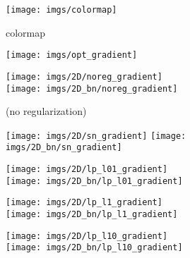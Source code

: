 \documentclass{article}
\begin{document}
\begin{figure}[h]

\begin{subfigure}{\linewidth}
\begin{subfigure}{.16\linewidth}
  \centering
  \texttt{[image: imgs/colormap]}
  \caption{colormap}
\end{subfigure}
\begin{subfigure}{.16\linewidth}
  \centering
  \texttt{[image: imgs/opt\_gradient]}
  \caption{}
\end{subfigure}
\begin{subfigure}{.33\linewidth}
  \texttt{[image: imgs/2D/noreg\_gradient]}\hfill
  \texttt{[image: imgs/2D\_bn/noreg\_gradient]}
  \caption{ (no regularization)}
\end{subfigure}
\begin{subfigure}{.33\linewidth}
  \texttt{[image: imgs/2D/sn\_gradient]}\hfill
  \texttt{[image: imgs/2D\_bn/sn\_gradient]}
  \caption{}
\end{subfigure}
\end{subfigure}\par

\begin{subfigure}{\linewidth}
\begin{subfigure}{.33\linewidth}
  \texttt{[image: imgs/2D/lp\_l01\_gradient]}\hfill
  \texttt{[image: imgs/2D\_bn/lp\_l01\_gradient]}
  \caption{}
\end{subfigure}
\begin{subfigure}{.33\linewidth}
  \texttt{[image: imgs/2D/lp\_l1\_gradient]}\hfill
  \texttt{[image: imgs/2D\_bn/lp\_l1\_gradient]}
  \caption{}
\end{subfigure}
\begin{subfigure}{.33\linewidth}
  \texttt{[image: imgs/2D/lp\_l10\_gradient]}\hfill
  \texttt{[image: imgs/2D\_bn/lp\_l10\_gradient]}
  \caption{}
\end{subfigure}
\end{subfigure}\par


\end{figure}
\end{document}

